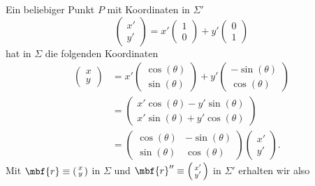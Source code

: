 Ein beliebiger Punkt $P$ mit Koordinaten in $\Sigma'$
\begin{equation}
  \begin{pmatrix}
    x' \\ y'
  \end{pmatrix} = x'\begin{pmatrix}
    1 \\ 0
  \end{pmatrix}+ y'\begin{pmatrix}
    0 \\ 1
  \end{pmatrix}
\end{equation}
hat in $\Sigma$ die folgenden Koordinaten
\begin{equation}
  \begin{split}
    \begin{pmatrix}
    x \\ y
  \end{pmatrix} &= x'\begin{pmatrix}
    \cos(\theta) \\ \sin(\theta)
  \end{pmatrix}+ y'\begin{pmatrix}
    -\sin(\theta) \\ \cos(\theta)
  \end{pmatrix} \\
  &=\begin{pmatrix}
    x'\cos(\theta)-y'\sin(\theta) \\ x'\sin(\theta)+y'\cos(\theta)
  \end{pmatrix}\\
  &= \begin{pmatrix}
    \cos(\theta) & -\sin(\theta) \\ 
    \sin(\theta) & \cos(\theta) 
  \end{pmatrix} \begin{pmatrix}
    x' \\ y'
  \end{pmatrix}. 
  \end{split}
\end{equation}
Mit $\mbf{r} \equiv \left( \begin{smallmatrix}
x \\ y
\end{smallmatrix}\right)$ in $\Sigma$ und $\mbf{r}'' \equiv \left( \begin{smallmatrix}
x' \\ y'
\end{smallmatrix}\right)$ in $\Sigma'$ erhalten wir also
